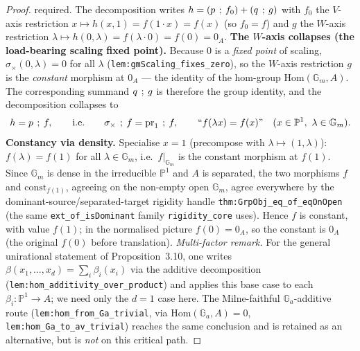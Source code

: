 \begin{proof}
  required. The decomposition writes \(h = (p \fatsemi f_0) + (q \fatsemi g)\) with \(f_0\) the
  \(V\)-axis restriction \(x \mapsto h(x, 1) = f(1 \cdot x) = f(x)\) (so \(f_0 = f\)) and \(g\) the
  \(W\)-axis restriction \(\lambda \mapsto h(0, \lambda) = f(\lambda \cdot 0) = f(0) = 0_A\).
  \textbf{The \(W\)-axis collapses (the load-bearing scaling fixed point).} Because \(0\) is a
  \emph{fixed point} of scaling, \(\sigma_\times(0, \lambda) = 0\) for all \(\lambda\)
  (\texttt{lem:gmScaling_fixes_zero}), so the \(W\)-axis
  restriction \(g\) is the \emph{constant} morphism at \(0_A\) --- the identity of the hom-group
  \(\mathrm{Hom}(\mathbb G_m, A)\). The corresponding summand \(q \fatsemi g\) is therefore the group
  identity, and the decomposition collapses to
  \[ h = p \fatsemi f, \qquad\text{i.e.}\qquad
     \sigma_\times \fatsemi f = \mathrm{pr}_1 \fatsemi f, \qquad
     \text{``}f(\lambda x) = f(x)\text{''} \quad (x \in \mathbb P^1,\ \lambda \in \mathbb G_m). \]
  \textbf{Constancy via density.} Specialise \(x = 1\) (precompose with \(\lambda \mapsto (1,
  \lambda)\)): \(f(\lambda) = f(1)\) for all \(\lambda \in \mathbb G_m\), i.e.\ \(f|_{\mathbb G_m}\) is
  the constant morphism at \(f(1)\). Since \(\mathbb G_m\) is dense in the irreducible \(\mathbb P^1\)
  and \(A\) is separated, the two morphisms \(f\) and \(\mathrm{const}_{f(1)}\), agreeing on the
  non-empty open \(\mathbb G_m\), agree everywhere by the dominant-source/separated-target rigidity
  handle \texttt{thm:GrpObj_eq_of_eqOnOpen} (the same \texttt{ext\_of\_isDominant} family
  \texttt{rigidity\_core} uses). Hence \(f\) is constant, with value \(f(1)\); in the normalised
  picture \(f(0) = 0_A\), so the constant is \(0_A\) (the original \(f(0)\) before translation).
  \medskip
  \noindent\emph{Multi-factor remark.} For the general unirational statement of Proposition~3.10,
  one writes \(\beta(x_1, \ldots, x_d) = \sum_i \beta_i(x_i)\) via the additive decomposition
  (\texttt{lem:hom_additivity_over_product}) and applies this base case to each \(\beta_i \colon
  \mathbb P^1 \to A\); we need only the \(d = 1\) case here. The Milne-faithful \(\mathbb
  G_a\)-additive route (\texttt{lem:hom_from_Ga_trivial}, via \(\mathrm{Hom}(\mathbb G_a, A) = 0\),
  \texttt{lem:hom_Ga_to_av_trivial}) reaches the same conclusion and is retained as an alternative,
  but is \emph{not} on this critical path.

\end{proof}
